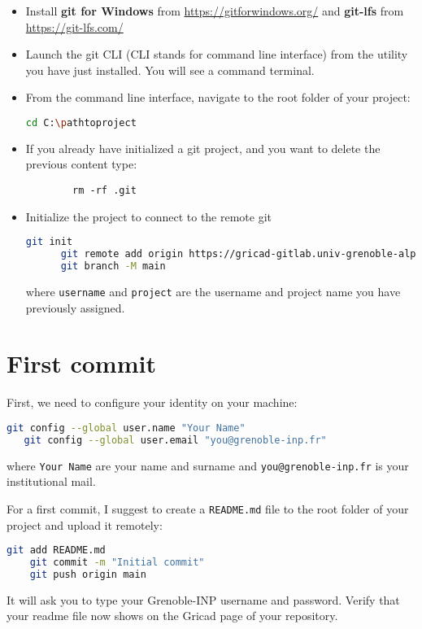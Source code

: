 \documentclass{article}
\begin{document}
\begin{itemize}
    \item Install \textbf{git for Windows} from \url{https://gitforwindows.org/} and \textbf{git-lfs} from \url{https://git-lfs.com/}
    \item Launch the git CLI (CLI stands for command line interface) from the utility you have just installed. You will see a command terminal.
    \item From the command line interface, navigate to the root folder of your project:
    \begin{lstlisting}[language=bash]
        cd C:\pathtoproject        
    \end{lstlisting}
    \item If you already have initialized a git project, and you want to delete the previous content type:
    \begin{verbatim}
        rm -rf .git
    \end{verbatim}
    \item Initialize the project to connect to the remote git
    \begin{lstlisting}[language=bash]
      git init
      git remote add origin https://gricad-gitlab.univ-grenoble-alpes.fr/username/project.git
      git branch -M main
    \end{lstlisting}
    where \texttt{username} and \texttt{project} are the username and project name you have previously assigned.
\end{itemize}

\section*{First commit}

First, we need to configure your identity on your machine:
\begin{lstlisting}[language=bash]
   git config --global user.name "Your Name"
   git config --global user.email "you@grenoble-inp.fr"
\end{lstlisting}
where \texttt{Your Name} are your name and surname and \texttt{you@grenoble-inp.fr} is your institutional mail.

For a first commit, I suggest to create a \texttt{README.md} file to the root folder of your project and upload it remotely:
\begin{lstlisting}[language=bash]
    git add README.md
    git commit -m "Initial commit"
    git push origin main
\end{lstlisting}
It will ask you to type your Grenoble-INP username and password.
Verify that your readme file now shows on the Gricad page of your repository.
\end{document}
